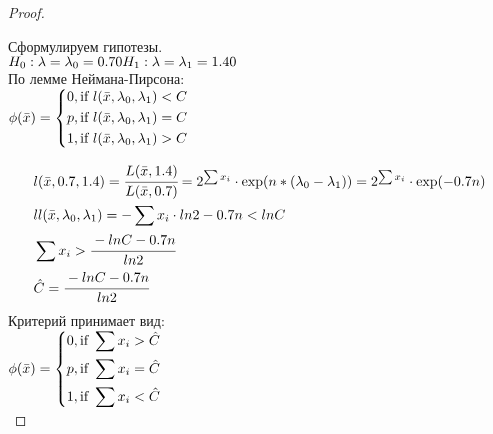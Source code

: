 \begin{proof}
	$ $
	
	Сформулируем гипотезы. \\
	$H_0:\lambda=\lambda_0=0.70 \\ H_1:\lambda=\lambda_1=1.40$ \\
	По лемме Неймана-Пирсона: \\
		
	$\phi(\bar x)=\left\{
	\begin{gathered}
		0, \text{if } l(\bar x, \lambda_0, \lambda_1)<C \hfill \\
		p, \text{if } l(\bar x, \lambda_0, \lambda_1)=C \hfill \\
		1, \text{if } l(\bar x, \lambda_0, \lambda_1)>C \hfill \\ 
	\end{gathered}
	\right.$
	
	\begin{align}
		& l(\bar x, 0.7, 1.4)=\cfrac{L(\bar x, 1.4)}{L(\bar x, 0.7)}=2^{\sum x_i}\cdot \exp(n*(\lambda_0-\lambda_1))=2^{\sum x_i}\cdot \exp(-0.7n) \\
		& ll(\bar x, \lambda_0, \lambda_1)=-\sum x_i\cdot ln2-0.7n<lnC \\ 
		& \sum x_i > \cfrac{-lnC-0.7n}{ln2} \\
		& \hat{C}=\cfrac{-lnC-0.7n}{ln2} \\
	\end{align}
	Критерий принимает вид: \\
	
	$\phi(\bar x)=\left\{
	\begin{gathered}
		0, \text{if } \sum x_i>\hat{C} \hfill \\
		p, \text{if } \sum x_i=\hat{C} \hfill \\
		1, \text{if } \sum x_i<\hat{C} \hfill \\ 
	\end{gathered}
	\right.$	\\
	

\end{proof}
